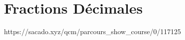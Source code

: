 

% 
% 


% 




\chapter{Fractions Décimales}
{https://sacado.xyz/qcm/parcours_show_course/0/117125}

